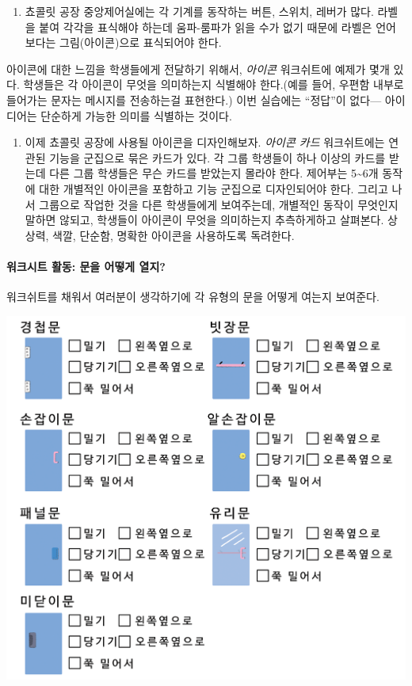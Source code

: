 \documentclass[]{article}
\begin{document}
\begin{enumerate}
\itemsep1pt\parskip0pt
\item
  쵸콜릿 공장 중앙제어실에는 각 기계를 동작하는 버튼, 스위치, 레버가
  많다. 라벨을 붙여 각각을 표식해야 하는데 움파-룸파가 읽을 수가 없기
  때문에 라벨은 언어보다는 그림(아이콘)으로 표식되어야 한다.
\end{enumerate}

아이콘에 대한 느낌을 학생들에게 전달하기 위해서, \emph{아이콘}
워크쉬트에 예제가 몇개 있다. 학생들은 각 아이콘이 무엇을 의미하는지
식별해야 한다.(예를 들어, 우편함 내부로 들어가는 문자는 메시지를
전송하는걸 표현한다.) 이번 실습에는 ``정답''이 없다--- 아이디어는
단순하게 가능한 의미를 식별하는 것이다.

\begin{enumerate}
\itemsep1pt\parskip0pt
\item
  이제 쵸콜릿 공장에 사용될 아이콘을 디자인해보자. \emph{아이콘 카드}
  워크쉬트에는 연관된 기능을 군집으로 묶은 카드가 있다. 각 그룹 학생들이
  하나 이상의 카드를 받는데 다른 그룹 학생들은 무슨 카드를 받았는지
  몰라야 한다. 제어부는 5\textasciitilde{}6개 동작에 대한 개별적인
  아이콘을 포함하고 기능 군집으로 디자인되어야 한다. 그리고 나서
  그룹으로 작업한 것을 다른 학생들에게 보여주는데, 개별적인 동작이
  무엇인지 말하면 않되고, 학생들이 아이콘이 무엇을 의미하는지
  추측하게하고 살펴본다. 상상력, 색깔, 단순함, 명확한 아이콘을
  사용하도록 독려한다.
\end{enumerate}

\mbox{}\paragraph{워크시트 활동: 문을 어떻게 열지?}\label{section-265}

워크쉬트를 채워서 여러분이 생각하기에 각 유형의 문을 어떻게 여는지
보여준다.

\includegraphics{csunplugged/06-part/img/ch20-hci/19-hci-04-open-doors.png}
\end{document}
